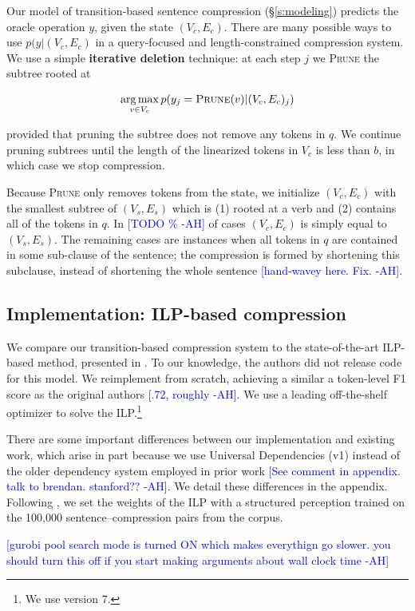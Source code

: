 \documentclass[11pt,a4paper]{article}
\newcommand{\ahcomment}[1]{\textcolor{blue}{[#1 -AH]}}
\DeclareMathOperator*{\argmaxA}{arg\,max} %
\begin{document}
Our model of transition-based sentence compression (\S\ref{s:modeling}) predicts the oracle operation $y$, given the state $(V_c, E_c)$. There are many possible ways to use $p(y|(V_c, E_c)$ in a query-focused and length-constrained compression system. We use a simple \textbf{iterative deletion} technique: at each step $j$ we \textsc{Prune} the subtree rooted at 

$$\argmaxA_{v \in V_c}   p(y_j = \textsc{Prune}(v) | (V_c, E_c)_j)$$

\noindent provided that pruning the subtree does not remove any tokens in $q$. We continue pruning subtrees until the length of the linearized tokens in $V_c$ is less than $b$, in which case we stop compression. 

Because \textsc{Prune} only removes tokens from the state, we initialize $(V_c, E_c)$ with the smallest subtree of $(V_s, E_s)$ which is (1) rooted at a verb and (2) contains all of the tokens in $q$. In \ahcomment{TODO \%} of cases $(V_c, E_c)$ is simply equal to $(V_s, E_s)$. The remaining cases are instances when all tokens in $q$ are contained in some sub-clause of the sentence; the compression is formed by shortening this subclause, instead of shortening the whole sentence \ahcomment{hand-wavey here. Fix.}. 

\subsection{Implementation: ILP-based compression}\label{s:ilp}

We compare our transition-based compression system to the state-of-the-art ILP-based method, presented in \citet{filippova2013overcoming}. To our knowledge, the authors did not release code for this model. We reimplement from scratch, achieving a similar a token-level F1 score as the original authors \ahcomment{.72, roughly}. We use a leading off-the-shelf optimizer \cite{gurobi} to solve the ILP.\footnote{We use version 7.} 

There are some important differences between our implementation and existing work, which arise in part because we use Universal Dependencies (v1) instead of the older dependency system employed in prior work \ahcomment{See comment in appendix. talk to brendan. stanford??}. We detail these differences in the appendix. Following \citet{filippova2013overcoming}, we set the weights of the ILP with a structured perception trained on the 100,000 sentence--compression pairs from the corpus.

\ahcomment{gurobi pool search mode is turned ON which makes everythign go slower. you should turn this off if you start making arguments about wall clock time}
\end{document}
